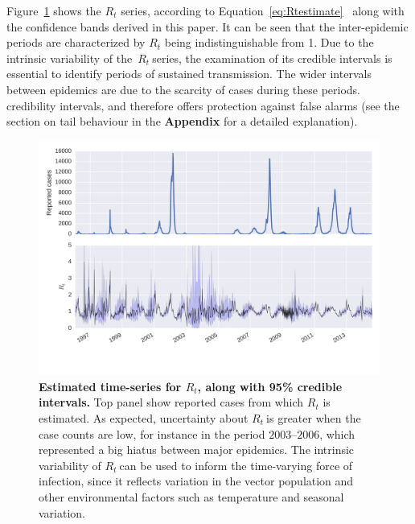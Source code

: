 \documentclass[10pt]{article}
\def \rr {$R_{t}\:$}
\begin{document}
Figure~\ref{fig:rtseries} shows the $R_t$ series, according to 
Equation~\ref{eq:Rtestimate}~\citep{nishiura} along with the confidence bands 
derived 
in this paper. 
It can be seen that the inter-epidemic periods are characterized by $R_t$ being 
indistinguishable from 1.
Due to the intrinsic variability of the~\rr series, the examination of its 
credible intervals is essential to identify periods of sustained transmission.
The wider intervals between epidemics are due to the scarcity of cases during 
these periods. 
credibility intervals, and therefore offers protection against false alarms 
(see 
the section on tail behaviour in the \textbf{Appendix} for a detailed 
explanation).
\begin{center}
\begin{figure}[!h]
 \centering
 \includegraphics[width=16cm]{./plots/rt_series.png}
 \caption{{\bf Estimated time-series for $R_t$, along with 95\% credible 
intervals.} Top panel show reported cases from which $R_t$ is estimated.
As expected, uncertainty about \rr is greater when the case counts are low, for 
instance in the period $2003$--$2006$, which represented a big hiatus between 
major epidemics.
The intrinsic variability of \rr can be used to inform the time-varying force 
of infection, since it reflects variation in the vector population and other 
environmental factors such as temperature and seasonal variation.}
\label{fig:rtseries}
\end{figure}
\end{center}
\end{document}
